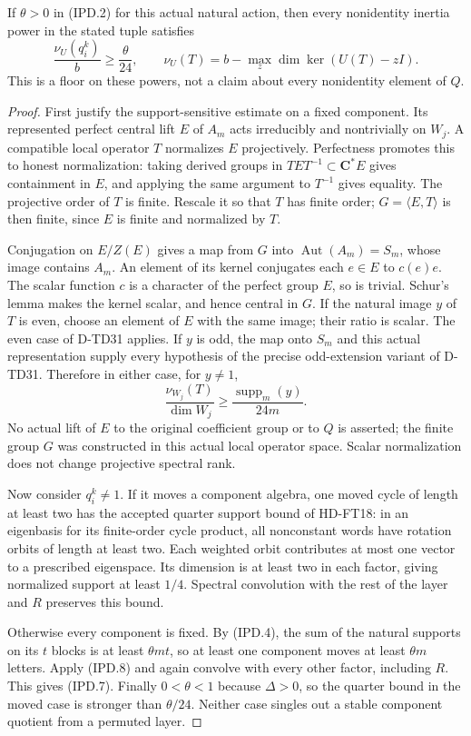 \begin{lemma}
If \(\theta>0\) in (IPD.2) for this actual natural action,
then every nonidentity inertia power in the stated tuple satisfies
\[
 \frac{\nu_U(q_i^k)}{b}\ge\frac{\theta}{24},\qquad
 \nu_U(T)=b-\max_z\dim\ker(U(T)-zI).
 \tag{IPD.7}
\]
This is a floor on these powers, not a claim about every
nonidentity element of \(Q\).
\end{lemma}

\begin{proof}
First justify the support-sensitive estimate on a fixed component.
Its represented perfect central lift \(E\) of \(A_m\) acts
irreducibly and nontrivially on \(W_j\). A compatible local
operator \(T\) normalizes \(E\) projectively. Perfectness
promotes this to honest normalization: taking derived groups in
\(TET^{-1}\subset\mathbf C^*E\) gives containment in \(E\),
and applying the same argument to \(T^{-1}\) gives equality.
The projective order of \(T\) is finite. Rescale it so that
\(T\) has finite order; \(G=\langle E,T\rangle\) is then
finite, since \(E\) is finite and normalized by \(T\).

Conjugation on \(E/Z(E)\) gives a map from \(G\) into
\(\operatorname{Aut}(A_m)=S_m\), whose image contains \(A_m\).
An element of its kernel conjugates each \(e\in E\) to
\(c(e)e\). The scalar function \(c\) is a character of the
perfect group \(E\), so is trivial. Schur's lemma makes the
kernel scalar, and hence central in \(G\). If the natural
image \(y\) of \(T\) is even, choose an element of \(E\)
with the same image; their ratio is scalar. The even case of
D-TD31 applies. If \(y\) is odd, the map onto \(S_m\) and
this actual representation supply every hypothesis of the
precise odd-extension variant of D-TD31. Therefore in either
case, for \(y\ne1\),
\[
 \frac{\nu_{W_j}(T)}{\dim W_j}
       \ge\frac{\operatorname{supp}_m(y)}{24m}.
 \tag{IPD.8}
\]
No actual lift of \(E\) to the original coefficient group or
to \(Q\) is asserted; the finite group \(G\) was constructed
in this actual local operator space. Scalar normalization does
not change projective spectral rank.

Now consider \(q_i^k\ne1\). If it moves a component algebra,
one moved cycle of length at least two has the accepted quarter
support bound of HD-FT18: in an eigenbasis for its finite-order
cycle product, all nonconstant words have rotation orbits of
length at least two. Each weighted orbit contributes at most
one vector to a prescribed eigenspace. Its dimension is at
least two in each factor, giving normalized support at least
\(1/4\). Spectral convolution with the rest of the layer and
\(R\) preserves this bound.

Otherwise every component is fixed. By (IPD.4), the sum of
the natural supports on its \(t\) blocks is at least
\(\theta mt\), so at least one component moves at least
\(\theta m\) letters. Apply (IPD.8) and again convolve with
every other factor, including \(R\). This gives (IPD.7).
Finally \(0<\theta<1\) because \(\Delta>0\), so the
quarter bound in the moved case is stronger than \(\theta/24\).
Neither case singles out a stable component quotient from
a permuted layer.
\end{proof}

